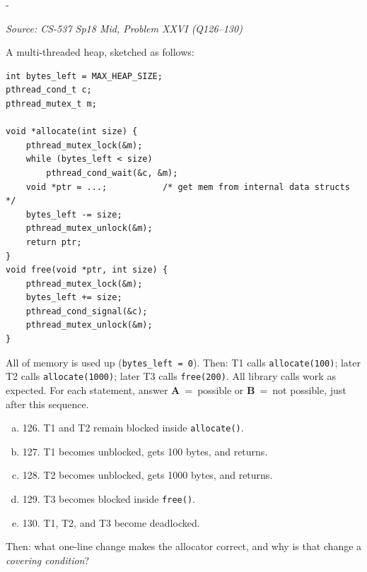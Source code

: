 \documentclass[11pt,a4paper]{article}
\makeatletter
\newcommand{\keepspace}[1]{\par\penalty-100\begingroup
  \setlength{\dimen@}{#1}\dimen@ii\pagegoal\advance\dimen@ii-\pagetotal
  \ifdim\dimen@>\dimen@ii\ifdim\dimen@ii>\z@\vfil\fi\break\fi\endgroup}
\newcounter{qn}[section]
\newenvironment{Qn}[4]{%
  \refstepcounter{qn}\keepspace{7\baselineskip}%
  \begin{tcolorbox}[qboxstyle, title={Q\thesection.\theqn\ \ [#1 \textbar\ #2]\ \ #4}]%
  {\footnotesize\color{g3}\textit{Source: #3}}\par\smallskip%
}{%
  \end{tcolorbox}%
}
\makeatother
\begin{document}
\begin{Qn}{Medium-Hard}{Lect 18}{CS-537 Sp18 Mid, Problem XXVI (Q126--130)}{Allocator: \texttt{signal} may wake the wrong waiter}
A multi-threaded heap, sketched as follows:
\begin{lstlisting}[numbers=none]
int bytes_left = MAX_HEAP_SIZE;
pthread_cond_t c;
pthread_mutex_t m;

void *allocate(int size) {
    pthread_mutex_lock(&m);
    while (bytes_left < size)
        pthread_cond_wait(&c, &m);
    void *ptr = ...;           /* get mem from internal data structs */
    bytes_left -= size;
    pthread_mutex_unlock(&m);
    return ptr;
}
void free(void *ptr, int size) {
    pthread_mutex_lock(&m);
    bytes_left += size;
    pthread_cond_signal(&c);
    pthread_mutex_unlock(&m);
}
\end{lstlisting}
All of memory is used up (\texttt{bytes\_left = 0}).
Then: T1 calls \texttt{allocate(100)}; later T2 calls
\texttt{allocate(1000)}; later T3 calls \texttt{free(200)}.
All library calls work as expected. For each statement, answer
\textbf{A}~=~possible or \textbf{B}~=~not possible, just after this
sequence.

\begin{enumerate}[(a)]
\item 126. T1 and T2 remain blocked inside \texttt{allocate()}.
\item 127. T1 becomes unblocked, gets 100 bytes, and returns.
\item 128. T2 becomes unblocked, gets 1000 bytes, and returns.
\item 129. T3 becomes blocked inside \texttt{free()}.
\item 130. T1, T2, and T3 become deadlocked.
\end{enumerate}
Then: what one-line change makes the allocator correct, and why is
that change a \emph{covering condition}?
\end{Qn}
\end{document}
